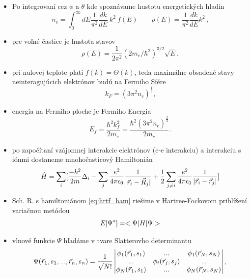 \documentclass[
	11pt, %
]{beamer}
\begin{document}
\begin{frame}
\begin{itemize}
\item Po integrovaní cez $\phi$ a $\theta$ kde spoznávame hustotu energetických hladín
\begin{equation}
 \label{eq:N integral sfer energ}
 n_e =   \int_0^{\infty} dE \frac{1}{\pi^2}  \frac{dk}{dE} \ k^2 \ f(E)  \qquad \rho(E)=\frac{1}{\pi^2} \frac{dk}{dE} k^2  \ \text{,}
\end{equation}
\item pre voľné častice je hustota stavov 
\begin{equation}
 \label{eq:rho_par}
 \rho(E)=\frac{1}{2\pi^2}{(2 m_e/\hbar^2)}^{3/2} \sqrt{E} \text{.}
\end{equation}
\item pri nulovej teplote platí $f(k)=\Theta(k)$, teda maximálne obsadené stavy neinteragujúcich elektrónov budú na Fermiho Sfére
\begin{equation}
 \label{eq:kf}
 k_F=(3\pi^2 n_e)^{\frac{1}{3}}\text{,}
\end{equation}
\item energia na Fermiho ploche je Fermiho Energia
\begin{equation}
 \label{eq:ef}
 E_f=\frac{\hbar^2 k_f^2}{2m_e}=\frac{\hbar^2(3\pi^2 n_e)^{\frac{2}{3}}  }{2m_e} \text{.}
\end{equation}
\end{itemize}
\end{frame}
\begin{frame}
\begin{itemize}
\item po započítaní vzájomnej interakcie elektrónov (e-e interakciu) a interakciu s iónmi dostaneme mnohočasticový Hamiltonián
\begin{equation}
\label{eq:hrtf_ham}
\hat{H}=\sum_i [ \frac{-\hbar^2}{2m}\Delta_i  -\sum_j\frac{e^2}{4\pi \epsilon_0}{\frac{1}{|\vec{r}_i-\vec{R}_j|}} +\frac{1}{2}\sum_{j\neq i}\frac{e^2}{4\pi\epsilon_0}\frac{1}{|\vec{r}_i-\vec{r}_j|} ]
\end{equation}
\item Sch. R. s hamiltoniánom \eqref{eq:hrtf_ham} riešime v Hartree-Fockovom priblížení variačnou metódou
\begin{equation}
\label{eq:erg_func}
E[\Psi^*]=<\Psi|H|\Psi>
\end{equation}
\item vlnové funkcie $\Psi$ hľadáme v tvare Slatterovho determinantu 
\begin{equation}
\label{eq:slatter}
\Psi(\vec{r}_1,s_1,...,\vec{r}_n,s_n)=\frac{1}{\sqrt N!}
\begin{vmatrix}
\phi_1(\vec{r}_1,s_1)& ... & \phi_1(\vec{r}_N,s_N) \\
...& \phi_i(\vec{r}_j,s_j)& ... \\
\phi_N(\vec{r}_1,s_1)& ... & \phi_N(\vec{r}_N,s_N)
\end{vmatrix}
\text{,}
\end{equation}
\end{itemize}
\end{frame}
\end{document}

